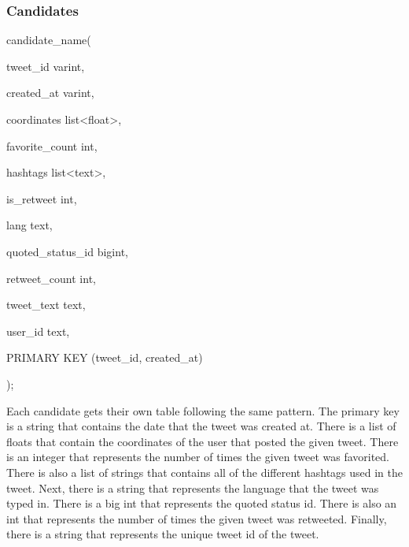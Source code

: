 \documentclass[letterpaper,12pt,english]{sphinxmanual}
\begin{document}
\subsubsection{\textbf{Candidates}}
\label{schema:candidates}
\begin{DUlineblock}{0em}
\item[] candidate\_name(
\item[]
\begin{DUlineblock}{\DUlineblockindent}
\item[] tweet\_id varint,
\item[] created\_at varint,
\item[] coordinates list\textless{}float\textgreater{},
\item[] favorite\_count int,
\item[] hashtags list\textless{}text\textgreater{},
\item[] is\_retweet int,
\item[] lang text,
\item[] quoted\_status\_id bigint,
\item[] retweet\_count int,
\item[] tweet\_text text,
\item[] user\_id text,
\item[] PRIMARY KEY (tweet\_id, created\_at)
\item[]
\begin{DUlineblock}{\DUlineblockindent}
\item[] );
\end{DUlineblock}
\end{DUlineblock}
\end{DUlineblock}

\begin{DUlineblock}{0em}
\item[] Each candidate gets their own table following the same pattern. The primary key is a string that contains the date that the tweet was created at. There is a list of floats that contain the coordinates of the user that posted the given tweet. There is an integer that represents the number of times the given tweet was favorited. There is also a list of strings that contains all of the different hashtags used in the tweet. Next, there is a string that represents the language that the tweet was typed in. There is a big int that represents the quoted status id. There is also an int that represents the number of times the given tweet was retweeted. Finally, there is a string that represents the unique tweet id of the tweet.
\end{DUlineblock}
\end{document}
